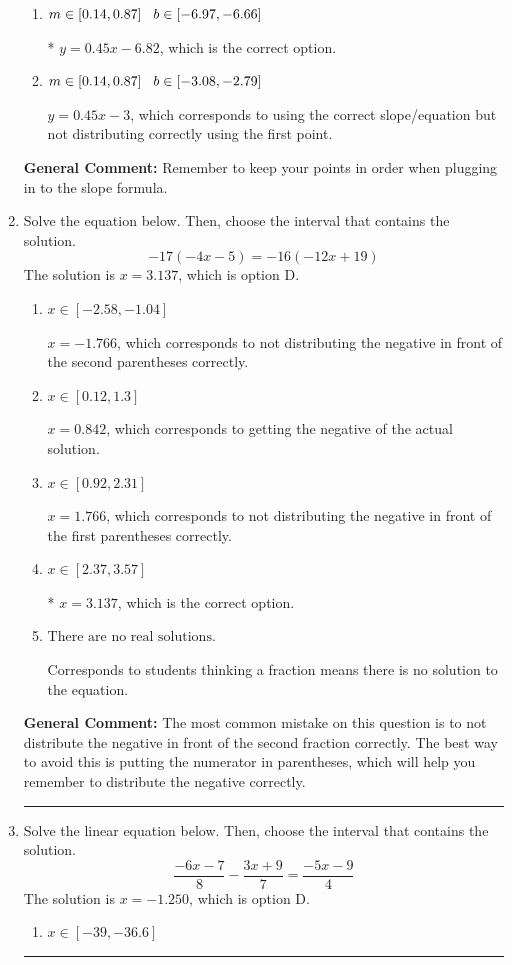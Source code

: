 \documentclass{extbook}[14pt]
\newcommand{\litem}[1]{\item #1

\rule{\textwidth}{0.4pt}}
\begin{document}
\begin{enumerate}
{\begin{enumerate}[label=\Alph*.]
 $y = 0.45x -9$, which corresponds to using the correct slope/equation but not distributing correctly using the second point.
\item \( m \in [0.14, 0.87] \hspace*{3mm} b \in [-6.97, -6.66] \)

* $y = 0.45x -6.82$, which is the correct option.
\item \( m \in [0.14, 0.87] \hspace*{3mm} b \in [-3.08, -2.79] \)

 $y = 0.45x -3$, which corresponds to using the correct slope/equation but not distributing correctly using the first point.
\end{enumerate}

\textbf{General Comment:} Remember to keep your points in order when plugging in to the slope formula.
}
\litem{
Solve the equation below. Then, choose the interval that contains the solution.
\[ -17(-4x -5) = -16(-12x + 19) \]The solution is \( x = 3.137 \), which is option D.\begin{enumerate}[label=\Alph*.]
\item \( x \in [-2.58, -1.04] \)

$x = -1.766$, which corresponds to not distributing the negative in front of the second parentheses correctly.
\item \( x \in [0.12, 1.3] \)

$x = 0.842$, which corresponds to getting the negative of the actual solution.
\item \( x \in [0.92, 2.31] \)

$x = 1.766$, which corresponds to not distributing the negative in front of the first parentheses correctly.
\item \( x \in [2.37, 3.57] \)

* $x = 3.137$, which is the correct option.
\item \( \text{There are no real solutions.} \)

Corresponds to students thinking a fraction means there is no solution to the equation.
\end{enumerate}

\textbf{General Comment:} The most common mistake on this question is to not distribute the negative in front of the second fraction correctly. The best way to avoid this is putting the numerator in parentheses, which will help you remember to distribute the negative correctly.
}
\litem{
Solve the linear equation below. Then, choose the interval that contains the solution.
\[ \frac{-6x -7}{8} - \frac{3x + 9}{7} = \frac{-5x -9}{4} \]The solution is \( x = -1.250 \), which is option D.\begin{enumerate}[label=\Alph*.]
\item \( x \in [-39, -36.6] \)


\end{enumerate}}
\end{enumerate}
\end{document}
